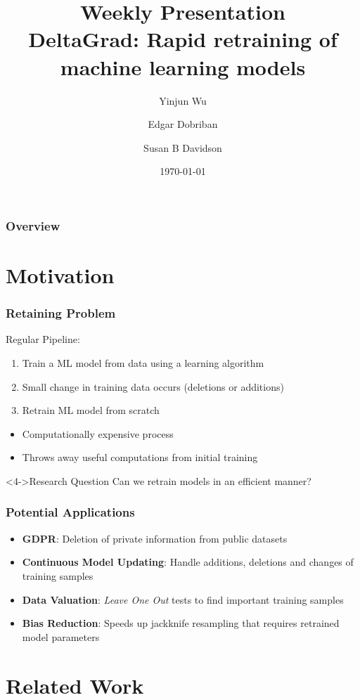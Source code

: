 \documentclass[pdf]{beamer}
\title[DeltaGrad]{Weekly Presentation\\DeltaGrad: Rapid retraining of machine learning models}
\author[Wu et al.~]{Yinjun Wu \and Edgar Dobriban \and Susan B Davidson}
\date{\today}
\begin{document}
\begin{frame}
    \titlepage
\end{frame}

\begin{frame}
    \frametitle{Overview}
    \tableofcontents
\end{frame}


\section{Motivation}
\begin{frame}
    \frametitle{Retaining Problem}
    Regular Pipeline:
    \begin{enumerate}
      \item Train a ML model from data using a learning algorithm
      \item Small change in training data occurs (deletions or additions)
      \item Retrain ML model from scratch
    \end{enumerate}

    \begin{itemize}
      \item<2-> Computationally expensive process
      \item<3-> Throws away useful computations from initial training
    \end{itemize}
    \begin{block}<4->{Research Question}
      Can we retrain models in an efficient manner?
    \end{block}
\end{frame}

\begin{frame}
  \frametitle{Potential Applications}
  \begin{itemize}
    \item<1-> \textbf{GDPR}: Deletion of private information from public datasets
    \item<2-> \textbf{Continuous Model Updating}: Handle additions, deletions and changes of training samples
    \item<3-> \textbf{Data Valuation}: \textit{Leave One Out} tests to find important training samples 
    \item<4-> \textbf{Bias Reduction}: Speeds up jackknife resampling that requires retrained model parameters 
  \end{itemize}
  

\end{frame}
\section{Related Work}
\end{document}
